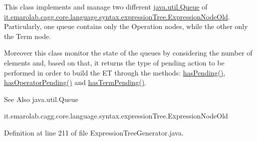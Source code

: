 This class implements and manage two different \hyperlink{}{java.\-util.\-Queue} of \hyperlink{}{it.\-emarolab.\-cagg.\-core.\-language.\-syntax.\-expression\-Tree.\-Expression\-Node\-Old}. Particularly, one queue contains only the Operation nodes, while the other only the Term node.\par


Moreover this class monitor the state of the queues by considering the number of elements and, based on that, it returns the type of pending action to be performed in order to build the E\-T through the methods\-: \hyperlink{classit_1_1emarolab_1_1cagg_1_1core_1_1language_1_1syntax_1_1expressionTree_1_1ExpressionTreeGenerator_1_1ExpressionQueues_a3e49595a6682e2ca900f3813c126483d}{has\-Pending()}, \hyperlink{classit_1_1emarolab_1_1cagg_1_1core_1_1language_1_1syntax_1_1expressionTree_1_1ExpressionTreeGenerator_1_1ExpressionQueues_a5ff877a384ed748289205e308ff44c86}{has\-Operator\-Pending()} and \hyperlink{classit_1_1emarolab_1_1cagg_1_1core_1_1language_1_1syntax_1_1expressionTree_1_1ExpressionTreeGenerator_1_1ExpressionQueues_a2c9534c7a8be5f7520995da947185db5}{has\-Term\-Pending()}. 

\begin{DoxySeeAlso}{See Also}
java.\-util.\-Queue 

it.\-emarolab.\-cagg.\-core.\-language.\-syntax.\-expression\-Tree.\-Expression\-Node\-Old 
\end{DoxySeeAlso}


Definition at line 211 of file Expression\-Tree\-Generator.\-java.



